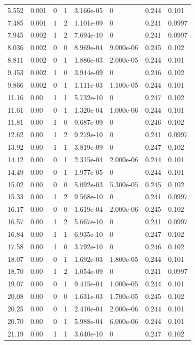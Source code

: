 \documentclass[preview]{standalone}
\begin{document}
{{\begin{tabular}{L{1.2cm}C{1.2cm} C{0.3cm}C{0.5cm} C{1.4cm}C{1.4cm} C{1.4cm}C{1.4cm}}
  5.552  &  0.001  & 0     &  1 &  3.166e-05  & 0  & 0.244 &  0.101   \\ 
  7.485  &  0.001  & 1     &  2 &  1.101e-09  & 0  & 0.241 &  0.0997   \\ 
  7.945  &  0.002  & 1     &  2 &  7.694e-10  & 0  & 0.241 &  0.0997   \\ 
  8.036  &  0.002  & 0     &  0 &  8.969e-04  & 9.000e-06  & 0.245 &  0.102   \\ 
  8.811  &  0.002  & 0     &  1 &  1.886e-03  & 2.000e-05  & 0.244 &  0.101   \\ 
  9.453  &  0.002  & 1     &  0 &  3.944e-09  & 0  & 0.246 &  0.102   \\ 
  9.866  &  0.002  & 0     &  1 &  1.111e-03  & 1.100e-05  & 0.244 &  0.101   \\ 
  11.16  &  0.00  & 1     &  1 &  5.732e-10  & 0  & 0.247 &  0.102   \\ 
  11.61  &  0.00  & 0     &  1 &  1.320e-04  & 1.000e-06  & 0.244 &  0.101   \\ 
  11.81  &  0.00  & 1     &  0 &  9.687e-09  & 0  & 0.246 &  0.102   \\ 
  12.62  &  0.00  & 1     &  2 &  9.279e-10  & 0  & 0.241 &  0.0997   \\ 
  13.92  &  0.00  & 1     &  1 &  3.819e-09  & 0  & 0.247 &  0.102   \\ 
  14.12  &  0.00  & 0     &  1 &  2.315e-04  & 2.000e-06  & 0.244 &  0.101   \\ 
  14.49  &  0.00  & 0     &  1 &  1.977e-05  & 0  & 0.244 &  0.101   \\ 
  15.02  &  0.00  & 0     &  0 &  5.092e-03  & 5.300e-05  & 0.245 &  0.102   \\ 
  15.33  &  0.00  & 1     &  2 &  9.568e-10  & 0  & 0.241 &  0.0997   \\ 
  16.17  &  0.00  & 0     &  0 &  1.619e-04  & 2.000e-06  & 0.245 &  0.102   \\ 
  16.57  &  0.00  & 1     &  2 &  5.667e-10  & 0  & 0.241 &  0.0997   \\ 
  16.84  &  0.00  & 1     &  1 &  6.935e-10  & 0  & 0.247 &  0.102   \\ 
  17.58  &  0.00  & 1     &  0 &  3.792e-10  & 0  & 0.246 &  0.102   \\ 
  18.07  &  0.00  & 0     &  1 &  1.692e-03  & 1.800e-05  & 0.244 &  0.101   \\ 
  18.70  &  0.00  & 1     &  2 &  1.054e-09  & 0  & 0.241 &  0.0997   \\ 
  19.07  &  0.00  & 0     &  1 &  9.415e-04  & 1.000e-05  & 0.244 &  0.101   \\ 
  20.08  &  0.00  & 0     &  0 &  1.631e-03  & 1.700e-05  & 0.245 &  0.102   \\ 
  20.25  &  0.00  & 0     &  1 &  2.410e-04  & 2.000e-06  & 0.244 &  0.101   \\ 
  20.70  &  0.00  & 0     &  1 &  5.988e-04  & 6.000e-06  & 0.244 &  0.101   \\ 
  21.19  &  0.00  & 1     &  1 &  3.640e-10  & 0  & 0.247 &  0.102   \\ 
\hline 
\end{tabular} 

}}
\end{document}
